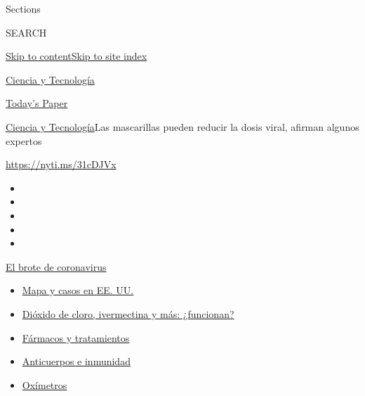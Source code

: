 Sections

SEARCH

\protect\hyperlink{site-content}{Skip to
content}\protect\hyperlink{site-index}{Skip to site index}

\href{https://www.nytimes3xbfgragh.onion/es/section/ciencia-y-tecnologia}{Ciencia
y Tecnología}

\href{https://myaccount.nytimes3xbfgragh.onion/auth/login?response_type=cookie\&client_id=vi}{}

\href{https://www.nytimes3xbfgragh.onion/section/todayspaper}{Today's
Paper}

\href{/es/section/ciencia-y-tecnologia}{Ciencia y
Tecnología}\textbar{}Las mascarillas pueden reducir la dosis viral,
afirman algunos expertos

\url{https://nyti.ms/31cDJVx}

\begin{itemize}
\item
\item
\item
\item
\item
\end{itemize}

\href{https://www.nytimes3xbfgragh.onion/es/spotlight/coronavirus?action=click\&pgtype=Article\&state=default\&region=TOP_BANNER\&context=storylines_menu}{El
brote de coronavirus}

\begin{itemize}
\tightlist
\item
  \href{https://www.nytimes3xbfgragh.onion/es/interactive/2020/espanol/mundo/coronavirus-en-estados-unidos.html?action=click\&pgtype=Article\&state=default\&region=TOP_BANNER\&context=storylines_menu}{Mapa
  y casos en EE. UU.}
\item
  \href{https://www.nytimes3xbfgragh.onion/es/2020/07/23/espanol/america-latina/bolivia-cloro-coronavirus-ivermectina.html?action=click\&pgtype=Article\&state=default\&region=TOP_BANNER\&context=storylines_menu}{Dióxido
  de cloro, ivermectina y más: ¿funcionan?}
\item
  \href{https://www.nytimes3xbfgragh.onion/es/interactive/2020/science/coronavirus-tratamientos-curas.html?action=click\&pgtype=Article\&state=default\&region=TOP_BANNER\&context=storylines_menu}{Fármacos
  y tratamientos}
\item
  \href{https://www.nytimes3xbfgragh.onion/es/2020/07/28/espanol/ciencia-y-tecnologia/anticuerpos-coronavirus-inmunidad.html?action=click\&pgtype=Article\&state=default\&region=TOP_BANNER\&context=storylines_menu}{Anticuerpos
  e inmunidad}
\item
  \href{https://www.nytimes3xbfgragh.onion/es/2020/04/29/espanol/estilos-de-vida/oximetro-para-que-sirve.html?action=click\&pgtype=Article\&state=default\&region=TOP_BANNER\&context=storylines_menu}{Oxímetros}
\end{itemize}

